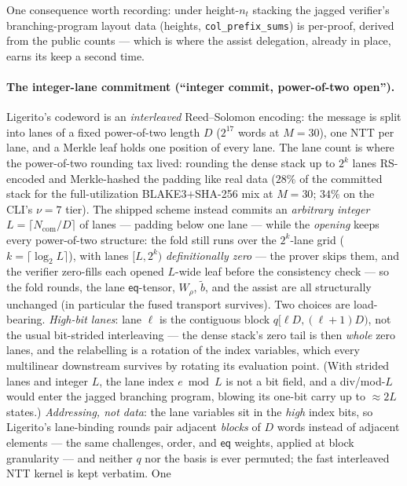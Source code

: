 \documentclass[11pt]{article}
\newcommand{\eq}{\mathsf{eq}}
\newcommand{\code}[1]{\texttt{#1}}
\theoremstyle{definition}
\begin{document}
One consequence worth recording: under height-$n_t$ stacking the jagged
verifier's branching-program layout data (heights,
\code{col\_prefix\_sums}) is per-proof, derived from the public counts
--- which is where the assist delegation, already in place, earns its
keep a second time.

\paragraph{The integer-lane commitment (``integer commit, power-of-two
open'').} Ligerito's codeword is an \emph{interleaved} Reed--Solomon
encoding: the message is split into lanes of a fixed power-of-two
length $D$ ($2^{17}$ words at $M = 30$), one NTT per lane, and a Merkle
leaf holds one position of every lane. The lane count is where the
power-of-two rounding tax lived: rounding the dense stack up to
$2^{k}$ lanes RS-encoded and Merkle-hashed the padding like real data
($28\%$ of the committed stack for the full-utilization
BLAKE3$+$SHA-256 mix at $M = 30$; $34\%$ on the CLI's $\nu = 7$ tier).
The shipped scheme instead commits an \emph{arbitrary integer}
$L = \lceil N_{\mathrm{com}} / D \rceil$ of lanes --- padding below one
lane --- while the \emph{opening} keeps every power-of-two structure:
the fold still runs over the $2^{k}$-lane grid
($k = \lceil \log_2 L \rceil$), with lanes $[L, 2^{k})$
\emph{definitionally zero} --- the prover skips them, and the verifier
zero-fills each opened $L$-wide leaf before the consistency check ---
so the fold rounds, the lane $\eq$-tensor, $W_\rho$, $\tilde b$, and
the assist are all structurally unchanged (in particular the fused
transport survives). Two choices are load-bearing. \emph{High-bit
lanes}: lane $\ell$ is the contiguous block
$q[\ell D, (\ell{+}1) D)$, not the usual bit-strided interleaving ---
the dense stack's zero tail is then \emph{whole} zero lanes, and the
relabelling is a rotation of the index variables, which every
multilinear downstream survives by rotating its evaluation point. (With
strided lanes and integer $L$, the lane index $e \bmod L$ is not a bit
field, and a div/mod-$L$ would enter the jagged branching program,
blowing its one-bit carry up to $\approx 2L$ states.) \emph{Addressing,
not data}: the lane variables sit in the \emph{high} index bits, so
Ligerito's lane-binding rounds pair adjacent \emph{blocks} of $D$ words
instead of adjacent elements --- the same challenges, order, and $\eq$
weights, applied at block granularity --- and neither $q$ nor the basis
is ever permuted; the fast interleaved NTT kernel is kept verbatim. One
\end{document}
